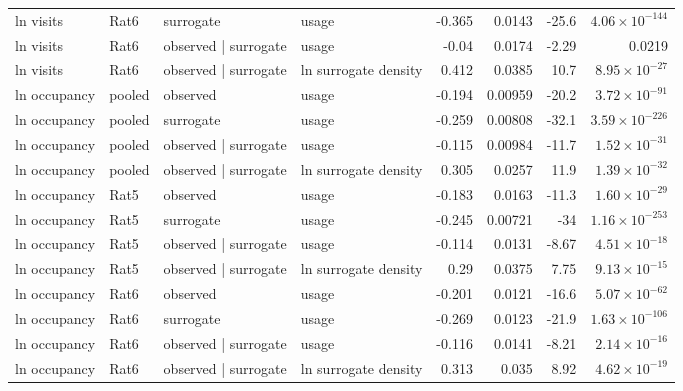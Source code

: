 \begin{table}[htbp]
\begin{tabular}{llllrrrr}
ln visits & Rat6 & surrogate & usage & -0.365 & 0.0143 & -25.6 & $4.06\times10^{-144}$ \\
ln visits & Rat6 & observed | surrogate & usage & -0.04 & 0.0174 & -2.29 & 0.0219 \\
ln visits & Rat6 & observed | surrogate & ln surrogate density & 0.412 & 0.0385 & 10.7 & $8.95\times10^{-27}$ \\
ln occupancy & pooled & observed & usage & -0.194 & 0.00959 & -20.2 & $3.72\times10^{-91}$ \\
ln occupancy & pooled & surrogate & usage & -0.259 & 0.00808 & -32.1 & $3.59\times10^{-226}$ \\
ln occupancy & pooled & observed | surrogate & usage & -0.115 & 0.00984 & -11.7 & $1.52\times10^{-31}$ \\
ln occupancy & pooled & observed | surrogate & ln surrogate density & 0.305 & 0.0257 & 11.9 & $1.39\times10^{-32}$ \\
ln occupancy & Rat5 & observed & usage & -0.183 & 0.0163 & -11.3 & $1.60\times10^{-29}$ \\
ln occupancy & Rat5 & surrogate & usage & -0.245 & 0.00721 & -34 & $1.16\times10^{-253}$ \\
ln occupancy & Rat5 & observed | surrogate & usage & -0.114 & 0.0131 & -8.67 & $4.51\times10^{-18}$ \\
ln occupancy & Rat5 & observed | surrogate & ln surrogate density & 0.29 & 0.0375 & 7.75 & $9.13\times10^{-15}$ \\
ln occupancy & Rat6 & observed & usage & -0.201 & 0.0121 & -16.6 & $5.07\times10^{-62}$ \\
ln occupancy & Rat6 & surrogate & usage & -0.269 & 0.0123 & -21.9 & $1.63\times10^{-106}$ \\
ln occupancy & Rat6 & observed | surrogate & usage & -0.116 & 0.0141 & -8.21 & $2.14\times10^{-16}$ \\
ln occupancy & Rat6 & observed | surrogate & ln surrogate density & 0.313 & 0.035 & 8.92 & $4.62\times10^{-19}$ \\
\bottomrule
\end{tabular}
\end{table}
